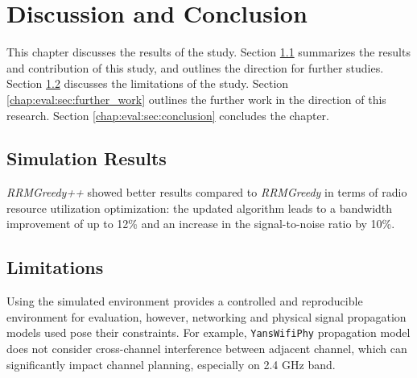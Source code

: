 \chapter{Discussion and Conclusion}
\label{chap:eval}

This chapter discusses the results of the study.
Section \ref{chap:eval:sec:results} summarizes the results and contribution of this study, and outlines the direction for further studies. Section \ref{chap:eval:sec:limitations} discusses the limitations of the study. Section \ref{chap:eval:sec:further_work} outlines the further work in the direction of this research. Section \ref{chap:eval:sec:conclusion} concludes the chapter.

\section{Simulation Results}
\label{chap:eval:sec:results}
\textit{RRMGreedy++} showed better results compared to \textit{RRMGreedy} in terms of radio resource utilization optimization: the updated algorithm leads to a bandwidth improvement of up to 12\% and an increase in the signal-to-noise ratio by 10\%.

\section{Limitations}
\label{chap:eval:sec:limitations}

Using the simulated environment provides a controlled and reproducible environment for evaluation, however, networking and physical signal propagation models used pose their constraints. For example, \texttt{YansWifiPhy} propagation model does not consider cross-channel interference between adjacent channel, which can significantly impact channel planning, especially on 2.4 GHz band.

